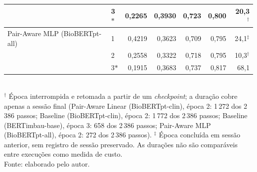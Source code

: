 \begin{table}[htbp]
{\begin{tabular}{llrrrrr}
 & 3$\ast$ & 0{,}2265 & 0{,}3930 & 0{,}723 & 0{,}800 & 20{,}3$^{\dagger}$ \\
\midrule
Pair-Aware MLP (BioBERTpt-all) & 1 & 0{,}4219 & 0{,}3623 & 0{,}709 & 0{,}795 & 24{,}1$^{\ddagger}$ \\
 & 2 & 0{,}2558 & 0{,}3322 & 0{,}718 & 0{,}795 & 10{,}3$^{\dagger}$ \\
 & 3$\ast$ & 0{,}1915 & 0{,}3683 & 0{,}737 & 0{,}817 & 68{,}1 \\
  \bottomrule
  \end{tabular}}\\[2pt]
  {\footnotesize $^{\dagger}$ Época interrompida e retomada a partir de um \emph{checkpoint}; a duração cobre apenas a sessão final (Pair-Aware Linear (BioBERTpt-clin), época 2: 1\,272 dos 2\,386 passos; Baseline (BioBERTpt-clin), época 2: 1\,772 dos 2\,386 passos; Baseline (BERTimbau-base), época 3: 658 dos 2\,386 passos; Pair-Aware MLP (BioBERTpt-all), época 2: 272 dos 2\,386 passos). $^{\ddagger}$ Época concluída em sessão anterior, sem registro de sessão preservado. As durações não são comparáveis entre execuções como medida de custo.}\\[4pt]
  {\footnotesize Fonte: elaborado pelo autor.}
\end{table}
